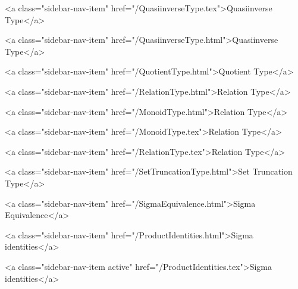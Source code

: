       
    
      
        
          <a class="sidebar-nav-item" href="/QuasiinverseType.tex">Quasiinverse Type</a>
        
      
    
      
        
          <a class="sidebar-nav-item" href="/QuasiinverseType.html">Quasiinverse Type</a>
        
      
    
      
        
          <a class="sidebar-nav-item" href="/QuotientType.html">Quotient Type</a>
        
      
    
      
        
          <a class="sidebar-nav-item" href="/RelationType.html">Relation Type</a>
        
      
    
      
        
          <a class="sidebar-nav-item" href="/MonoidType.html">Relation Type</a>
        
      
    
      
        
          <a class="sidebar-nav-item" href="/MonoidType.tex">Relation Type</a>
        
      
    
      
        
          <a class="sidebar-nav-item" href="/RelationType.tex">Relation Type</a>
        
      
    
      
        
          <a class="sidebar-nav-item" href="/SetTruncationType.html">Set Truncation Type</a>
        
      
    
      
        
          <a class="sidebar-nav-item" href="/SigmaEquivalence.html">Sigma Equivalence</a>
        
      
    
      
        
          <a class="sidebar-nav-item" href="/ProductIdentities.html">Sigma identities</a>
        
      
    
      
        
          <a class="sidebar-nav-item active" href="/ProductIdentities.tex">Sigma identities</a>
        
